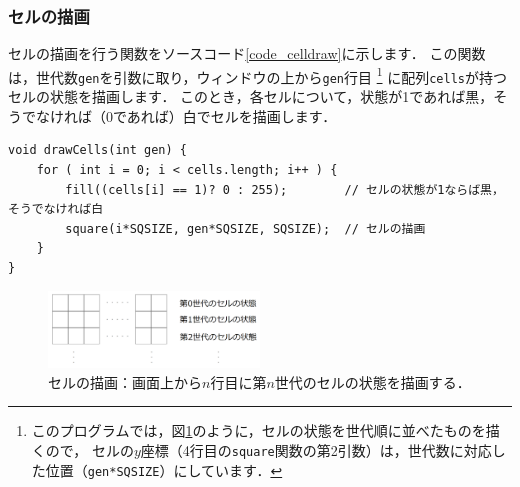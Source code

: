 \documentclass[dvipdfmx]{jsarticle}
\theoremstyle{definition}
\begin{document}
\subsubsection{セルの描画}  \label{subsubsec_cell_draw}
セルの描画を行う関数をソースコード\ref{code_celldraw}に示します．
この関数は，世代数\verb|gen|を引数に取り，ウィンドウの上から\verb|gen|行目
\footnote{
    このプログラムでは，図\ref{pic_eca_draw}のように，セルの状態を世代順に並べたものを描くので，
    セルの$y$座標（4行目の\texttt{square}関数の第2引数）は，世代数に対応した位置（\texttt{gen*SQSIZE}）にしています．
}
に配列\verb|cells|が持つセルの状態を描画します．
このとき，各セルについて，状態が1であれば黒，そうでなければ（0であれば）白でセルを描画します．
%
\begin{lstlisting}[caption=セル描画関数, label=code_celldraw]
void drawCells(int gen) {
    for ( int i = 0; i < cells.length; i++ ) {
        fill((cells[i] == 1)? 0 : 255);        // セルの状態が1ならば黒，そうでなければ白
        square(i*SQSIZE, gen*SQSIZE, SQSIZE);  // セルの描画
    }
}
\end{lstlisting}
%
\begin{figure}[H]
    \centering
    \includegraphics[width=0.5\textwidth]{figure/eca/eca_draw.png}
    \caption{セルの描画：画面上から$n$行目に第$n$世代のセルの状態を描画する．}
    \label{pic_eca_draw}
\end{figure}

\end{document}
